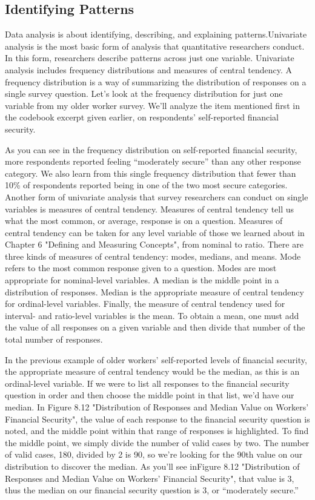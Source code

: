 \subsection{Identifying Patterns}

Data analysis is about identifying, describing, and explaining patterns.Univariate analysis is the most basic form of analysis that quantitative researchers conduct. In this form, researchers describe patterns across just one variable. Univariate analysis includes frequency distributions and measures of central tendency. A frequency distribution is a way of summarizing the distribution of responses on a single survey question. Let’s look at the frequency distribution for just one variable from my older worker survey. We’ll analyze the item mentioned first in the codebook excerpt given earlier, on respondents’ self-reported financial security.

As you can see in the frequency distribution on self-reported financial security, more respondents reported feeling “moderately secure” than any other response category. We also learn from this single frequency distribution that fewer than 10\% of respondents reported being in one of the two most secure categories. Another form of univariate analysis that survey researchers can conduct on single variables is measures of central tendency. Measures of central tendency tell us what the most common, or average, response is on a question. Measures of central tendency can be taken for any level variable of those we learned about in Chapter 6 "Defining and Measuring Concepts", from nominal to ratio. There are three kinds of measures of central tendency: modes, medians, and means. Mode refers to the most common response given to a question. Modes are most appropriate for nominal-level variables. A median is the middle point in a distribution of responses. Median is the appropriate measure of central tendency for ordinal-level variables. Finally, the measure of central tendency used for interval- and ratio-level variables is the mean. To obtain a mean, one must add the value of all responses on a given variable and then divide that number of the total number of responses.

In the previous example of older workers’ self-reported levels of financial security, the appropriate measure of central tendency would be the median, as this is an ordinal-level variable. If we were to list all responses to the financial security question in order and then choose the middle point in that list, we’d have our median. In Figure 8.12 "Distribution of Responses and Median Value on Workers’ Financial Security", the value of each response to the financial security question is noted, and the middle point within that range of responses is highlighted. To find the middle point, we simply divide the number of valid cases by two. The number of valid cases, 180, divided by 2 is 90, so we’re looking for the 90th value on our distribution to discover the median. As you’ll see inFigure 8.12 "Distribution of Responses and Median Value on Workers’ Financial Security", that value is 3, thus the median on our financial security question is 3, or “moderately secure.”

